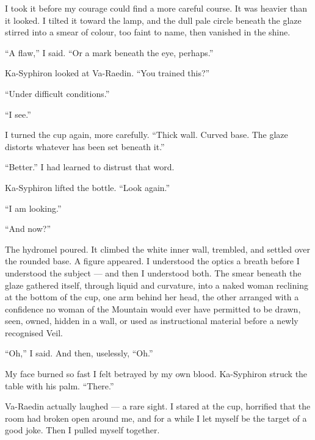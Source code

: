 I took it before my courage could find a more careful course. It was heavier than it looked.
I tilted it toward the lamp, and the dull pale circle beneath the glaze stirred into a smear of colour, too faint to name, then vanished in the shine.\par

``A flaw,'' I said. ``Or a mark beneath the eye, perhaps.''\par

Ka-Syphiron looked at Va-Raedin. ``You trained this?''\par

``Under difficult conditions.''\par

``I see.''\par

I turned the cup again, more carefully. ``Thick wall. Curved base. The glaze distorts whatever has been set beneath it.''\par

``Better.'' I had learned to distrust that word.\par

Ka-Syphiron lifted the bottle. ``Look again.''\par

``I am looking.''\par

``And now?''\par

The hydromel poured. It climbed the white inner wall, trembled, and settled over the rounded base.
A figure appeared. I understood the optics a breath before I understood the subject --- and then I understood both.
The smear beneath the glaze gathered itself, through liquid and curvature, into a naked woman reclining at the bottom of the cup, one arm behind her head, the other arranged with a confidence no woman of the Mountain would ever have permitted to be drawn, seen, owned, hidden in a wall, or used as instructional material before a newly recognised Veil.\par

``Oh,'' I said. And then, uselessly, ``Oh.''\par

My face burned so fast I felt betrayed by my own blood. Ka-Syphiron struck the table with his palm. ``There.''\par

Va-Raedin actually laughed --- a rare sight. I stared at the cup, horrified that the room had broken open around me, and for a while I let myself be the target of a good joke. Then I pulled myself together.\par

